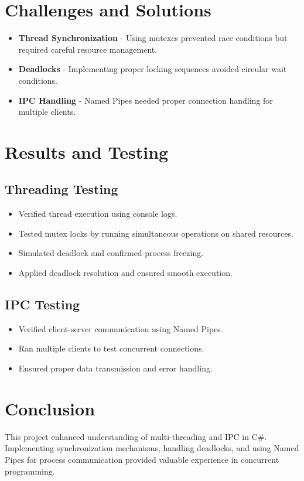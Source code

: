 \documentclass{article}
\begin{document}
\section{Challenges and Solutions}
\begin{itemize}
\item \textbf{Thread Synchronization} - Using mutexes prevented race conditions but required careful resource management.
\item \textbf{Deadlocks} - Implementing proper locking sequences avoided circular wait conditions.
\item \textbf{IPC Handling} - Named Pipes needed proper connection handling for multiple clients.
\end{itemize}

\section{Results and Testing}
\subsection{Threading Testing}
\begin{itemize}
\item Verified thread execution using console logs.
\item Tested mutex locks by running simultaneous operations on shared resources.
\item Simulated deadlock and confirmed process freezing.
\item Applied deadlock resolution and ensured smooth execution.
\end{itemize}

\subsection{IPC Testing}
\begin{itemize}
\item Verified client-server communication using Named Pipes.
\item Ran multiple clients to test concurrent connections.
\item Ensured proper data transmission and error handling.
\end{itemize}

\section{Conclusion}
This project enhanced understanding of multi-threading and IPC in C#. Implementing synchronization mechanisms, handling deadlocks, and using Named Pipes for process communication provided valuable experience in concurrent programming.
\end{document}
